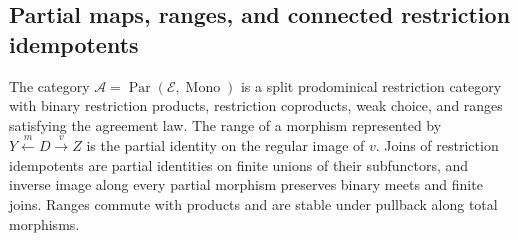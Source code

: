 \subsection{Partial maps, ranges, and connected restriction idempotents}

\begin{proposition}\label{prop:fork-structure}
The category $\mathcal A=\operatorname{Par}(\mathcal E,
\operatorname{Mono})$ is a split prodominical restriction category
with binary restriction products, restriction coproducts, weak
choice, and ranges satisfying the agreement law. The range of a morphism
represented by $Y\xleftarrow{m}D\xrightarrow{v}Z$ is the partial
identity on the regular image of $v$.
Joins of restriction idempotents are partial identities on finite
unions of their subfunctors, and inverse image along every partial
morphism preserves binary meets and finite joins. Ranges commute with products and
are stable under pullback along total morphisms.
\end{proposition}
